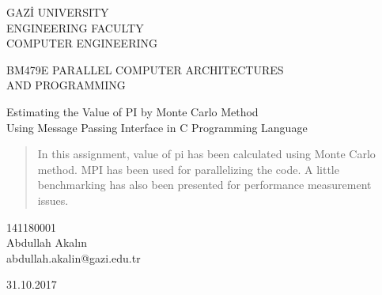 \renewcommand{\abstractname}{Abstract}
\begin{titlepage}
    \begin{center}
        \begin{large}
            \vspace*{0.5cm}
            GAZİ UNIVERSITY \\
            ENGINEERING FACULTY \\
            COMPUTER ENGINEERING

            \vfill
            BM479E PARALLEL COMPUTER ARCHITECTURES \\
            AND 
            PROGRAMMING

            \vfill
            Estimating the Value of PI by Monte Carlo Method \\
            Using Message Passing Interface in C Programming Language

            \vfill
            \begin{abstract}
            In this assignment, value of pi has been calculated using
            Monte Carlo method. MPI has been used for parallelizing the code.
            A little benchmarking has also been presented for performance measurement issues.
            \end{abstract}
        
            \vfill
            141180001\\Abdullah Akalın\\abdullah.akalin@gazi.edu.tr

            \vfill
            \vspace{0.5cm}
            31.10.2017
        \end{large}
    \end{center}
\end{titlepage}
